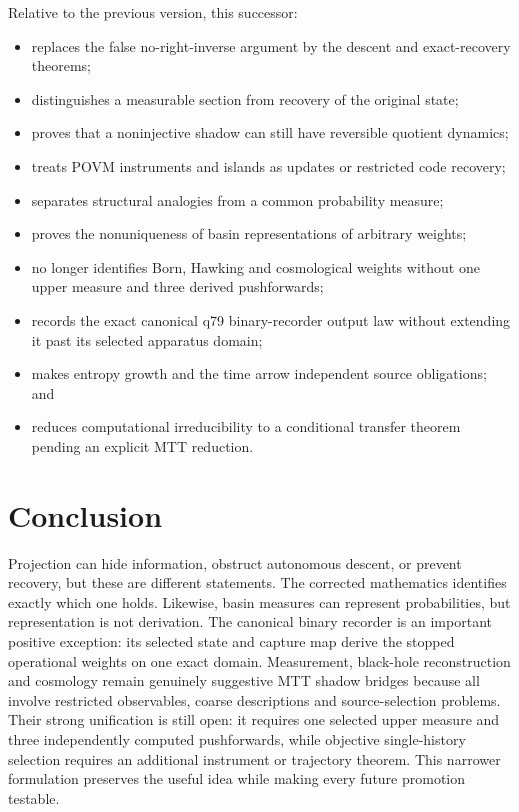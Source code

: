 \documentclass[11pt]{article}
\begin{document}
Relative to the previous version, this successor:
\begin{itemize}
\item replaces the false no-right-inverse argument by the descent and exact-recovery
theorems;
\item distinguishes a measurable section from recovery of the original state;
\item proves that a noninjective shadow can still have reversible quotient dynamics;
\item treats POVM instruments and islands as updates or restricted code recovery;
\item separates structural analogies from a common probability measure;
\item proves the nonuniqueness of basin representations of arbitrary weights;
\item no longer identifies Born, Hawking and cosmological weights without one upper
measure and three derived pushforwards;
\item records the exact canonical q79 binary-recorder output law without extending it
past its selected apparatus domain;
\item makes entropy growth and the time arrow independent source obligations; and
\item reduces computational irreducibility to a conditional transfer theorem pending
an explicit MTT reduction.
\end{itemize}

\section{Conclusion}

Projection can hide information, obstruct autonomous descent, or prevent recovery,
but these are different statements. The corrected mathematics identifies exactly
which one holds. Likewise, basin measures can represent probabilities, but
representation is not derivation. The canonical binary recorder is an important
positive exception: its selected state and capture map derive the stopped operational
weights on one exact domain. Measurement, black-hole reconstruction and cosmology
remain genuinely suggestive MTT shadow bridges because all involve restricted
observables, coarse descriptions and source-selection problems. Their strong
unification is still open: it requires one selected upper measure and three
independently computed pushforwards, while objective single-history selection requires
an additional instrument or trajectory theorem. This narrower formulation preserves
the useful idea while making every future promotion testable.
\end{document}
